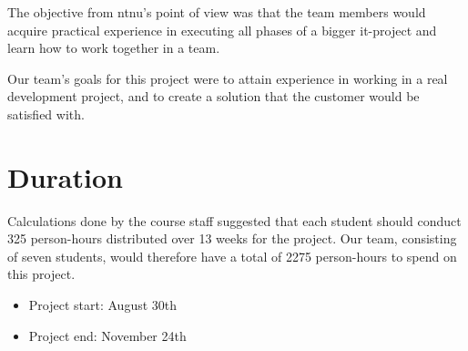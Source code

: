 The objective from \Gls{ntnu}'s point of view was that the team members would acquire practical experience in executing all phases of a bigger \Gls{it}-project and learn
how to work together in a team.

Our team's goals for this project were to attain experience in working in a real development project, and to create a solution that the customer
would be satisfied with.

\section{Duration}
Calculations done by the course staff suggested that each student should conduct 325 person-hours distributed over 13 weeks for the project. Our team, consisting of seven students, would therefore have a total of 2275 person-hours to spend on this project.\\
\begin {itemize}
	\item Project start: August 30th
	\item Project end: November 24th
\end{itemize}

